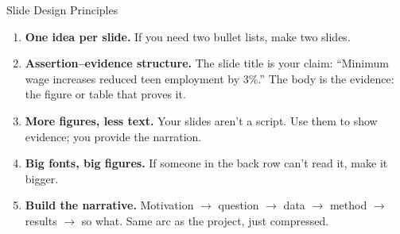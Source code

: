 \begin{frame}{Slide Design Principles}
  \begin{enumerate}
    \item \textbf{One idea per slide.} If you need two bullet lists, make two slides.

    \vspace{3pt}

    \item \textbf{Assertion--evidence structure.} The slide title is your claim: ``Minimum wage increases reduced teen employment by 3\%.'' The body is the evidence: the figure or table that proves it.

    \vspace{3pt}

    \item \textbf{More figures, less text.} Your slides aren't a script. Use them to show evidence; you provide the narration.

    \vspace{3pt}

    \item \textbf{Big fonts, big figures.} If someone in the back row can't read it, make it bigger.

    \vspace{3pt}

    \item \textbf{Build the narrative.} Motivation $\to$ question $\to$ data $\to$ method $\to$ results $\to$ so what. Same arc as the project, just compressed.
  \end{enumerate}
\end{frame}

